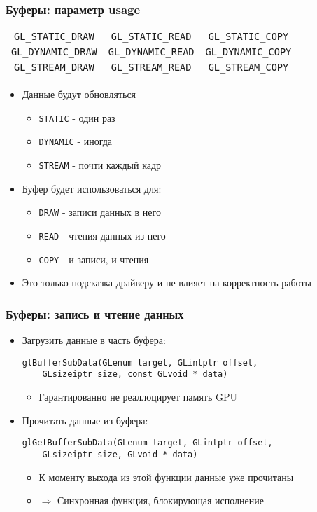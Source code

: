 \documentclass{beamer}
\begin{document}
\begin{frame}[fragile]
\frametitle{Буферы: параметр usage}
\begin{table}
\centering
\begin{tabular}{ c c c }
 \verb|GL_STATIC_DRAW| & \verb|GL_STATIC_READ| & \verb|GL_STATIC_COPY| \\ 
 \verb|GL_DYNAMIC_DRAW| & \verb|GL_DYNAMIC_READ| & \verb|GL_DYNAMIC_COPY| \\
 \verb|GL_STREAM_DRAW| & \verb|GL_STREAM_READ| & \verb|GL_STREAM_COPY|
\end{tabular}
\end{table}
\pause
\begin{itemize}
\item Данные будут обновляться
\begin{itemize}
\item \verb|STATIC| - один раз
\item \verb|DYNAMIC| - иногда
\item \verb|STREAM| - почти каждый кадр
\end{itemize}
\pause
\item Буфер будет использоваться для:
\begin{itemize}
\item \verb|DRAW| - записи данных в него
\item \verb|READ| - чтения данных из него
\item \verb|COPY| - и записи, и чтения
\end{itemize}
\pause
\item Это только подсказка драйверу и не влияет на корректность работы
\end{itemize}
\end{frame}

\begin{frame}[fragile]
\frametitle{Буферы: запись и чтение данных}
\begin{itemize}
\item Загрузить данные в часть буфера:
\begin{verbatim}
glBufferSubData(GLenum target, GLintptr offset,
    GLsizeiptr size, const GLvoid * data)
\end{verbatim}
\pause
\begin{itemize}
\item Гарантированно не реаллоцирует память GPU
\end{itemize}
\pause
\item Прочитать данные из буфера:
\begin{verbatim}
glGetBufferSubData(GLenum target, GLintptr offset,
    GLsizeiptr size, GLvoid * data)
\end{verbatim}
\pause
\begin{itemize}
\item К моменту выхода из этой функции данные уже прочитаны
\item \begin{math}\Rightarrow\end{math} Синхронная функция, блокирующая исполнение
\end{itemize}
\end{itemize}
\end{frame}
\end{document}
